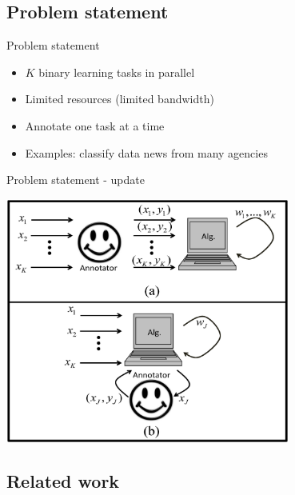 \documentclass{beamer}
\begin{document}
\subsection{Problem statement}

\begin{frame}{Problem statement}
\begin{itemize}
\item $K$ binary learning tasks  in parallel\newline
\item Limited resources (limited bandwidth) \newline
\item Annotate one task at a time \newline

\item Examples: classify data news from many agencies\newline
\end{itemize}
\end{frame}


\begin{frame}{Problem statement - update}
\begin{center}
\includegraphics[width=0.7\textwidth]{figs/SHAMPO_illustration.eps}
\end{center}
\end{frame}

\subsection{Related work}
\end{document}
